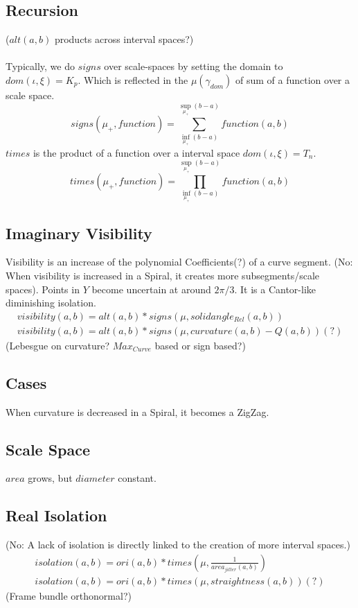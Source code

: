 \documentclass{report}
\begin{document}
\subsection{Recursion}
($alt(a,b)$ products across interval spaces?)\\\\
Typically, we do $signs$ over scale-spaces by setting the domain to $dom(\iota,\xi)=K_{p}$.
Which is reflected in the $\mu(\gamma_{dom})$ of sum of a function over a scale space.\\
\begin{equation}
signs(\mu_{+},function )= \sum \limits _{\inf \limits _{\mu_{+}} (b-a)}^{\sup \limits _{\mu_{+}} (b-a)} function (a,b)
\end{equation}
$times$ is the product of a function over a interval space $dom(\iota,\xi)=T_{n}$.
\begin{equation}
times(\mu_{+},function) = \prod_{\inf \limits _{\mu_{+}} (b-a)}^{\sup \limits _{\mu_{+}} (b-a)} function(a,b)
\end{equation}

\subsection{Imaginary Visibility}
Visibility is an increase of the polynomial Coefficients(?) of a curve segment.
(No: When visibility is increased in a Spiral, it creates more subsegments/scale spaces). Points in $Y$ become uncertain at around $2\pi/3$. It is a Cantor-like diminishing isolation.
\begin{align}
visibility(a,b)= alt(a,b) * signs(\mu,solidangle_{Rel}(a,b))\\
visibility(a,b)= alt(a,b) * signs(\mu,curvature(a,b)-Q(a,b))(?)
\end{align}
(Lebesgue on curvature? $Max_{Curve}$ based or sign based?)
\subsection*{Cases}
When curvature is decreased in a Spiral, it becomes a ZigZag.
\subsection*{Scale Space}
$area$ grows, but $diameter$ constant.

\subsection{Real Isolation}
(No: A lack of isolation is directly linked to the creation of more interval spaces.)
\begin{align}
isolation(a,b) = ori(a,b)*times(\mu,\frac{1}{area_{jitter}(a,b)})\\
isolation(a,b) = ori(a,b)*times(\mu,straightness(a,b))(?)
\end{align}
(Frame bundle orthonormal?)
\end{document}
